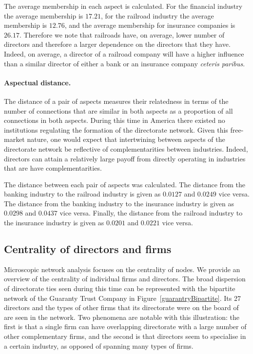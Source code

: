 \documentclass[11pt,fleqn]{article}
\begin{document}
The average membership in each aspect is calculated. For the financial industry the average membership is $17.21$, for the railroad industry the average membership is $12.76$, and the average membership for insurance companies is $26.17$. Therefore we note that railroads have, on average, lower number of directors and therefore a larger dependence on the directors that they have. Indeed, on average, a director of a railroad company will have a higher influence than a similar director of either a bank or an insurance company \emph{ceteris paribus}.

\paragraph{Aspectual distance.}

The distance of a pair of aspects measures their relatedness in terms of the number of connections that are similar in both aspects as a proportion of all connections in both aspects. During this time in America there existed no institutions regulating the formation of the directorate network. Given this free-market nature, one would expect that intertwining between aspects of the directorate network be reflective of complementarities between industries. Indeed, directors can attain a relatively large payoff from directly operating in industries that are have complementarities.

The distance between each pair of aspects was calculated. The distance from the banking industry to the railroad industry is given as $0.0127$ and $0.0249$ vice versa. The distance from the banking industry to the insurance industry is given as $0.0298$ and $0.0437$ vice versa. Finally, the distance from the railroad industry to the insurance industry is given as $0.0201$ and $0.0221$ vice versa.

\subsection{Centrality of directors and firms}

Microscopic network analysis focuses on the centrality of nodes. We provide an overview of the centrality of individual firms and directors. The broad dispersion of directorate ties seen during this time can be represented with the bipartite network of the Guaranty Trust Company in Figure~\ref{guarantryBipartite}. Its 27 directors and the types of other firms that its directorate were on the board of are seen in the network. Two phenomena are notable with this illustration: the first is that a single firm can have overlapping directorate with a large number of other complementary firms, and the second is that directors seem to specialise in a certain industry, as opposed of spanning many types of firms.
\end{document}
